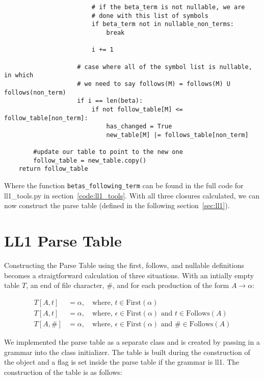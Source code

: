 \documentclass{article}
\begin{document}
\begin{verbatim}
                        # if the beta_term is not nullable, we are
                        # done with this list of symbols
                        if beta_term not in nullable_non_terms:
                            break

                        i += 1
                    
                    # case where all of the symbol list is nullable, in which
                    # we need to say follows(M) = follows(M) U follows(non_term)
                    if i == len(beta):
                        if not follow_table[M] <= follow_table[non_term]:
                            has_changed = True
                            new_table[M] |= follows_table[non_term]

        #update our table to point to the new one
        follow_table = new_table.copy()
    return follow_table
\end{verbatim}
\label{exerpt:follows}

Where the function \verb{betas_following_term{ can be found in the full code for ll1\_tools.py in section~\ref{code:ll1_tools}. With all three closures calculated, we can now construct the parse table (defined in the following section~\ref{sec:ll1}).

\section{LL1 Parse Table}
Constructing the Parse Table using the first, follows, and nullable definitions becomes a straigtforward calculation of three situations. With an intially empty table $T$, an end of file character, \#, and for each production of the form $A \rightarrow \alpha$:

\begin{align}
T\left[A,t\right] &= \alpha, \quad \text{where,  } t \in \text{First}\left(\alpha\right) \\
T\left[A,t\right] &= \alpha, \quad \text{where,  } \epsilon \in \text{First}\left(\alpha\right) \text{ and } t \in \text{Follows}\left(A\right) \\
T\left[A,\text{\#}\right] &= \alpha, \quad \text{where,  } \epsilon \in \text{First}\left(\alpha\right) \text{ and \# } \in \text{Follows}\left(A\right)
\end{align}
\label{sec:ll1}

We implemented the parse table as a separate class and is created by passing in a grammar into the class initializer. The table is built during the construction of the object and a flag is set inside the parse table if the grammar is ll1. The construction of the table is as follows:
\end{document}
